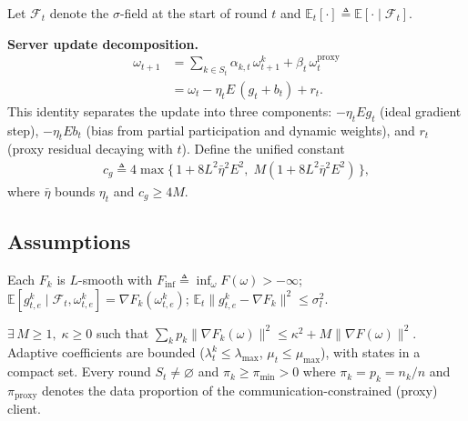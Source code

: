 Let \(\mathcal F_t\) denote the \(\sigma\)-field at the start of round \(t\) and \(\mathbb E_t[\cdot] \triangleq \mathbb E[\cdot \mid \mathcal F_t]\).

\noindent\textbf{Server update decomposition.}
\begin{align}
  \omega_{t+1}
  &= \sum_{k\in S_t}\alpha_{k,t}\,\omega_{t+1}^k + \beta_t\,\omega_t^{\mathrm{proxy}}  \\
  &= \omega_t - \eta_t E\,(g_t + b_t) + r_t.
  \label{eq:12}
\end{align}
This identity separates the update into three components:\;
\(-\eta_t E g_t\) (ideal gradient step),\;
\(-\eta_t E b_t\) (bias from partial participation and dynamic weights), and\;
\(r_t\) (proxy residual decaying with \(t\)).
Define the unified constant
\begin{align}
  c_g \triangleq 4\max\!\bigl\{\,1+8L^2\bar\eta^2 E^2,\; M(1+8L^2\bar\eta^2 E^2)\,\bigr\},
  \label{eq:13}
\end{align}
where \(\bar\eta\) bounds \(\eta_t\) and \(c_g \ge 4M\).

\subsection{Assumptions}

\begin{assumption}\label{asmp:1}
  Each \(F_k\) is \(L\)-smooth with \(F_{\inf} \triangleq \inf_\omega F(\omega) > -\infty\);
  \(\mathbb E[g_{t,e}^k \mid \mathcal F_t, \omega_{t,e}^k] = \nabla F_k(\omega_{t,e}^k)\);
  \(\mathbb E_t\|g_{t,e}^k - \nabla F_k\|^2 \le \sigma_l^2\).
\end{assumption}

\begin{assumption}\label{asmp:2}
  \(\exists\, M \ge 1,\;\kappa \ge 0\) such that
  \(\sum_k p_k \|\nabla F_k(\omega)\|^2 \le \kappa^2 + M\|\nabla F(\omega)\|^2\).
  Adaptive coefficients are bounded (\(\lambda_t^k \le \lambda_{\max}\), \(\mu_t \le \mu_{\max}\)), with states in a compact set.
  Every round \(S_t \neq \varnothing\) and \(\pi_k \ge \pi_{\min} > 0\) where \(\pi_k = p_k = n_k/n\) and \(\pi_{\mathrm{proxy}}\) denotes the data proportion of the communication-constrained (proxy) client.
\end{assumption}

